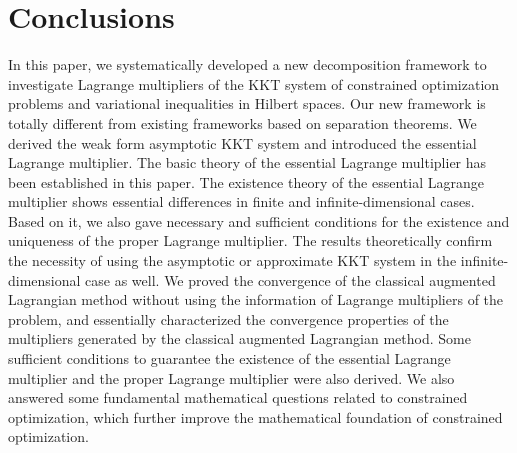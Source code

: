 \documentclass[leqno]{amsart}
\theoremstyle{definition}
\begin{document}
%


\section{Conclusions}
\label{sec:con}
In this paper, we systematically developed a new decomposition framework to investigate Lagrange multipliers of the KKT system  of constrained optimization problems and variational inequalities in Hilbert spaces. Our new framework is totally different from existing frameworks based on separation theorems. We derived the weak form asymptotic KKT system and introduced the essential Lagrange multiplier. The basic theory of the essential Lagrange multiplier has been established in this paper. The existence theory of the essential Lagrange multiplier shows essential differences in finite and infinite-dimensional cases. Based on it, we also gave necessary and sufficient conditions for the existence and uniqueness of the proper Lagrange multiplier. The results theoretically confirm the necessity of using the asymptotic or approximate KKT system in the infinite-dimensional case as well. We proved the convergence of the classical augmented Lagrangian method without using the information of Lagrange multipliers of the problem, and essentially characterized the convergence properties of the  multipliers generated by the classical augmented Lagrangian method. Some sufficient conditions to guarantee the existence of the essential Lagrange multiplier and the proper Lagrange multiplier were also derived. We also answered some fundamental mathematical questions related to constrained optimization, which further improve the mathematical foundation of constrained optimization. %
\end{document}
